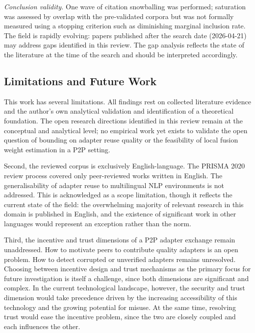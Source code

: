 \textit{Conclusion validity.}
One wave of citation snowballing was performed; saturation was assessed by overlap with the pre-validated corpora but was not formally measured using a stopping criterion such as diminishing marginal inclusion rate. The field is rapidly evolving: papers published after the search date (2026-04-21) may address gaps identified in this review. The gap analysis reflects the state of the literature at the time of the search and should be interpreted accordingly.

\subsection{Limitations and Future Work}
\label{sec:conclusion:limitations}

This work has several limitations. All findings rest on collected 
literature evidence and the author's own analytical validation and 
identification of a theoretical foundation. The open research directions identified in this review remain at the conceptual and analytical level; no empirical work yet exists to validate the open question of bounding on adapter reuse quality or the feasibility of local fusion weight estimation in a P2P setting.

Second, the reviewed corpus is exclusively English-language. The PRISMA 2020 
review process covered only peer-reviewed works written in English. The 
generalisability of adapter reuse to multilingual NLP environments is not 
addressed. This is acknowledged as a scope limitation, though it reflects 
the current state of the field: the overwhelming majority of relevant 
research in this domain is published in English, and the existence of 
significant work in other languages would represent an exception rather 
than the norm.

Third, the incentive and trust dimensions of a P2P adapter exchange remain
unaddressed. How to motivate peers to contribute quality adapters is an 
open problem. How to detect corrupted or unverified adapters remains 
unresolved. Choosing between incentive design and trust mechanisms as the 
primary focus for future investigation is itself a challenge, since both 
dimensions are significant and complex. In the current technological 
landscape, however, the security and trust dimension would take precedence driven by the increasing accessibility of this technology and the 
growing potential for misuse. At the same time, resolving trust would 
ease the incentive problem, since the two are closely coupled and each 
influences the other.

